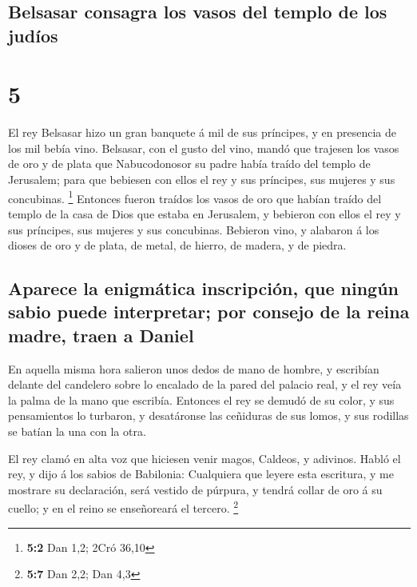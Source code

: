 \hypertarget{belsasar-consagra-los-vasos-del-templo-de-los-juduxedos}{%
\subsection{Belsasar consagra los vasos del templo de los
judíos}\label{belsasar-consagra-los-vasos-del-templo-de-los-juduxedos}}

\hypertarget{section-4}{%
\section{5}\label{section-4}}

 El rey Belsasar hizo un gran banquete á mil de sus
príncipes, y en presencia de los mil bebía vino.  Belsasar,
con el gusto del vino, mandó que trajesen los vasos de oro y de plata
que Nabucodonosor su padre había traído del templo de Jerusalem; para
que bebiesen con ellos el rey y sus príncipes, sus mujeres y sus
concubinas. \footnote{\textbf{5:2} Dan 1,2; 2Cró 36,10} 
Entonces fueron traídos los vasos de oro que habían traído del templo de
la casa de Dios que estaba en Jerusalem, y bebieron con ellos el rey y
sus príncipes, sus mujeres y sus concubinas.  Bebieron vino,
y alabaron á los dioses de oro y de plata, de metal, de hierro, de
madera, y de piedra.

\hypertarget{aparece-la-enigmuxe1tica-inscripciuxf3n-que-ninguxfan-sabio-puede-interpretar-por-consejo-de-la-reina-madre-traen-a-daniel}{%
\subsection{Aparece la enigmática inscripción, que ningún sabio puede
interpretar; por consejo de la reina madre, traen a
Daniel}\label{aparece-la-enigmuxe1tica-inscripciuxf3n-que-ninguxfan-sabio-puede-interpretar-por-consejo-de-la-reina-madre-traen-a-daniel}}

 En aquella misma hora salieron unos dedos de mano de
hombre, y escribían delante del candelero sobre lo encalado de la pared
del palacio real, y el rey veía la palma de la mano que escribía.
 Entonces el rey se demudó de su color, y sus pensamientos
lo turbaron, y desatáronse las ceñiduras de sus lomos, y sus rodillas se
batían la una con la otra.

 El rey clamó en alta voz que hiciesen venir magos, Caldeos,
y adivinos. Habló el rey, y dijo á los sabios de Babilonia: Cualquiera
que leyere esta escritura, y me mostrare su declaración, será vestido de
púrpura, y tendrá collar de oro á su cuello; y en el reino se
enseñoreará el tercero. \footnote{\textbf{5:7} Dan 2,2; Dan 4,3}

